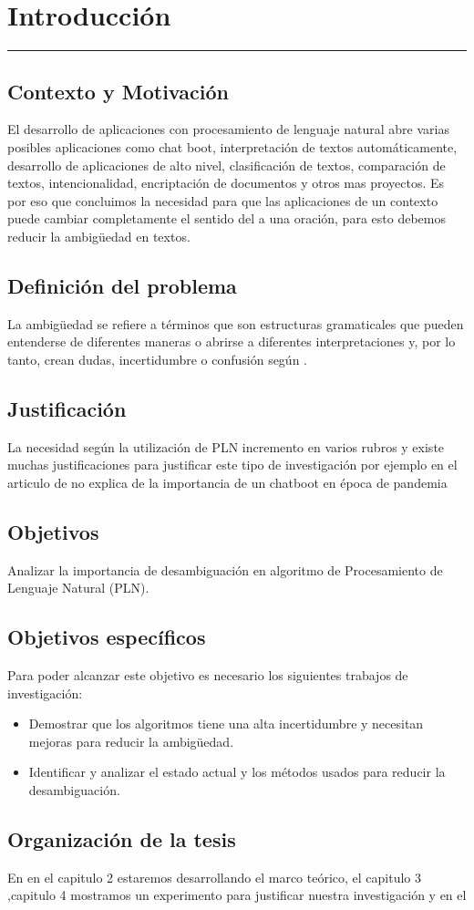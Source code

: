 \chapter{Introducción}
\hrule \bigskip \vspace*{1cm}
\section{Contexto y Motivación}
El desarrollo de aplicaciones con procesamiento de lenguaje natural abre varias posibles aplicaciones como chat boot, interpretación de textos automáticamente, desarrollo de aplicaciones de alto nivel, clasificación de textos, comparación de textos, intencionalidad, encriptación de documentos y otros mas proyectos. Es por eso que concluimos la necesidad para que las aplicaciones  de un contexto puede cambiar completamente el sentido del  a una oración, para esto debemos reducir la ambigüedad en textos.

\section{Definición del problema}
La ambigüedad se refiere a términos que son estructuras gramaticales que pueden entenderse de diferentes maneras o abrirse a diferentes interpretaciones y, por lo tanto, crean dudas, incertidumbre o confusión según \cite{EvaluacionAmbiguedad01}.

\section{Justificación}
La necesidad según \cite{Arquitectura} la utilización de PLN incremento en varios rubros y
existe muchas justificaciones para justificar este tipo de investigación por ejemplo en el articulo de \cite{ChatBoot} no explica de la importancia de un chatboot en época de pandemia


\section{Objetivos}

 Analizar la importancia de desambiguación en algoritmo de Procesamiento de Lenguaje Natural (PLN).

\section{Objetivos específicos}
Para poder alcanzar este objetivo es necesario los siguientes trabajos de investigación:
\begin{itemize}
  \item Demostrar que los algoritmos tiene una alta incertidumbre y necesitan mejoras para reducir la ambigüedad.
  \item Identificar y analizar el estado actual y los métodos usados para reducir la desambiguación.
\end{itemize}

\section{Organización de la tesis}

En en el capitulo 2 estaremos desarrollando el marco teórico, el capitulo 3 ,capitulo 4 mostramos un experimento para justificar nuestra investigación y en el
